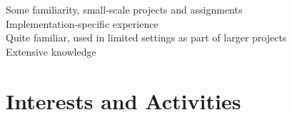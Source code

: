 \documentclass[a4paper,10pt]{article}
\begin{document}

\begin{center}
  \parbox{12cm}{
    \onenote Some familiarity, small-scale projects and assignments \\
    \twonotes Implementation-specific experience \\
    \threenotes Quite familiar, used in limited settings as part of larger projects \\
    \fournotes Extensive knowledge
  }
\end{center}

\vspace{1em}

\section{Interests and Activities}
\end{document}
